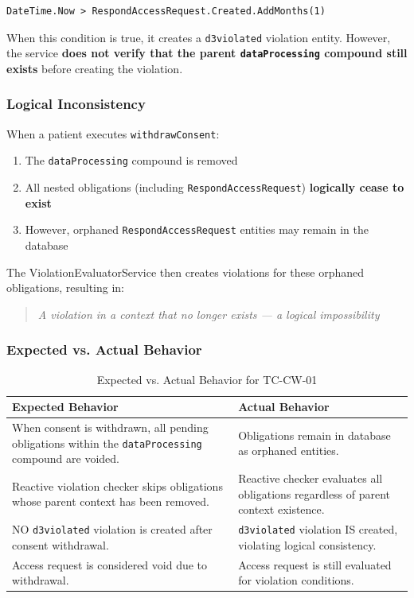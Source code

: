 \documentclass[11pt,a4paper]{article}
\begin{document}
\begin{verbatim}
DateTime.Now > RespondAccessRequest.Created.AddMonths(1)
\end{verbatim}

When this condition is true, it creates a \texttt{d3violated} violation entity. However, the service \textbf{does not verify that the parent \texttt{dataProcessing} compound still exists} before creating the violation.

\subsubsection{Logical Inconsistency}
When a patient executes \texttt{withdrawConsent}:
\begin{enumerate}
    \item The \texttt{dataProcessing} compound is removed
    \item All nested obligations (including \texttt{RespondAccessRequest}) \textbf{logically cease to exist}
    \item However, orphaned \texttt{RespondAccessRequest} entities may remain in the database
\end{enumerate}

The ViolationEvaluatorService then creates violations for these orphaned obligations, resulting in:
\begin{quote}
\textit{A violation in a context that no longer exists --- a logical impossibility}
\end{quote}

\subsubsection{Expected vs. Actual Behavior}

\begin{table}[h]
\centering
\begin{tabular}{|p{6cm}|p{6cm}|}
\hline
\rowcolor{gray!30}
\textbf{Expected Behavior} & \textbf{Actual Behavior} \\
\hline
When consent is withdrawn, all pending obligations within the \texttt{dataProcessing} compound are voided. & Obligations remain in database as orphaned entities. \\
\hline
Reactive violation checker skips obligations whose parent context has been removed. & Reactive checker evaluates all obligations regardless of parent context existence. \\
\hline
NO \texttt{d3violated} violation is created after consent withdrawal. & \texttt{d3violated} violation IS created, violating logical consistency. \\
\hline
Access request is considered void due to withdrawal. & Access request is still evaluated for violation conditions. \\
\hline
\end{tabular}
\caption{Expected vs. Actual Behavior for TC-CW-01}
\end{table}
\end{document}

